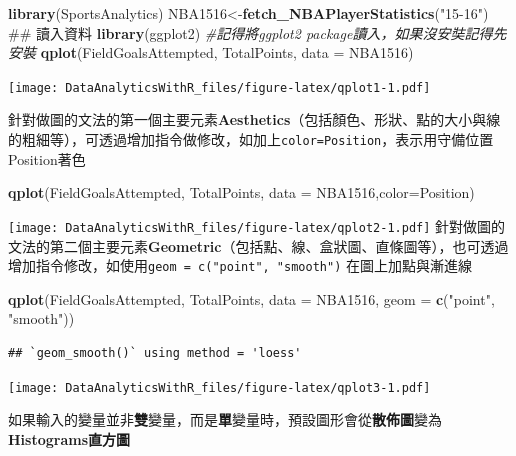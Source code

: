 \documentclass[]{book}
\newenvironment{Shaded}{\begin{snugshade}}{\end{snugshade}}
\newcommand{\KeywordTok}[1]{\textcolor[rgb]{0.13,0.29,0.53}{\textbf{{#1}}}}
\newcommand{\DataTypeTok}[1]{\textcolor[rgb]{0.13,0.29,0.53}{{#1}}}
\newcommand{\StringTok}[1]{\textcolor[rgb]{0.31,0.60,0.02}{{#1}}}
\newcommand{\CommentTok}[1]{\textcolor[rgb]{0.56,0.35,0.01}{\textit{{#1}}}}
\newcommand{\NormalTok}[1]{{#1}}
\theoremstyle{definition}
\theoremstyle{definition}
\theoremstyle{remark}
\begin{document}
\begin{Shaded}
\begin{Highlighting}[]
\KeywordTok{library}\NormalTok{(SportsAnalytics)}
\NormalTok{NBA1516<-}\KeywordTok{fetch_NBAPlayerStatistics}\NormalTok{(}\StringTok{"15-16"}\NormalTok{) ## 讀入資料}
\KeywordTok{library}\NormalTok{(ggplot2) }\CommentTok{#記得將ggplot2 package讀入，如果沒安奘記得先安裝}
\KeywordTok{qplot}\NormalTok{(FieldGoalsAttempted, TotalPoints, }\DataTypeTok{data =} \NormalTok{NBA1516)}
\end{Highlighting}
\end{Shaded}

\texttt{[image: DataAnalyticsWithR\_files/figure-latex/qplot1-1.pdf]}

針對做圖的文法的第一個主要元素\textbf{Aesthetics}（包括顏色、形狀、點的大小與線的粗細等），可透過增加指令做修改，如加上\texttt{color=Position}，表示用守備位置Position著色

\begin{Shaded}
\begin{Highlighting}[]
\KeywordTok{qplot}\NormalTok{(FieldGoalsAttempted, TotalPoints, }\DataTypeTok{data =} \NormalTok{NBA1516,}\DataTypeTok{color=}\NormalTok{Position)}
\end{Highlighting}
\end{Shaded}

\texttt{[image: DataAnalyticsWithR\_files/figure-latex/qplot2-1.pdf]}
針對做圖的文法的第二個主要元素\textbf{Geometric}（包括點、線、盒狀圖、直條圖等），也可透過增加指令修改，如使用\texttt{geom\ =\ c("point",\ "smooth")}
在圖上加點與漸進線

\begin{Shaded}
\begin{Highlighting}[]
\KeywordTok{qplot}\NormalTok{(FieldGoalsAttempted, TotalPoints, }\DataTypeTok{data =} \NormalTok{NBA1516,}
      \DataTypeTok{geom =} \KeywordTok{c}\NormalTok{(}\StringTok{"point"}\NormalTok{, }\StringTok{"smooth"}\NormalTok{))}
\end{Highlighting}
\end{Shaded}

\begin{verbatim}
## `geom_smooth()` using method = 'loess'
\end{verbatim}

\texttt{[image: DataAnalyticsWithR\_files/figure-latex/qplot3-1.pdf]}

如果輸入的變量並非\textbf{雙}變量，而是\textbf{單}變量時，預設圖形會從\textbf{散佈圖}變為\textbf{Histograms直方圖}
\end{document}
